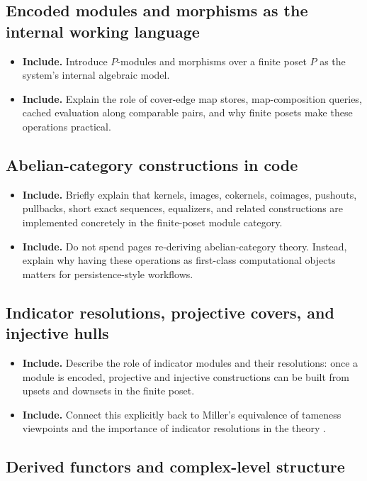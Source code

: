 \documentclass[11pt]{article}
\newenvironment{plan}{\begin{itemize}[leftmargin=1.6em,itemsep=0.35em,topsep=0.25em]}{\end{itemize}}
\newcommand{\includeitems}[1]{\item \textbf{Include.} #1}
\begin{document}
\subsection{Encoded modules and morphisms as the internal working language}

\begin{plan}
    \includeitems{Introduce $P$-modules and morphisms over a finite poset $P$ as the system's internal algebraic model.}
    \includeitems{Explain the role of cover-edge map stores, map-composition queries, cached evaluation along comparable pairs, and why finite posets make these operations practical.}
\end{plan}

\subsection{Abelian-category constructions in code}

\begin{plan}
    \includeitems{Briefly explain that kernels, images, cokernels, coimages, pushouts, pullbacks, short exact sequences, equalizers, and related constructions are implemented concretely in the finite-poset module category.}
    \includeitems{Do not spend pages re-deriving abelian-category theory. Instead, explain why having these operations as first-class computational objects matters for persistence-style workflows.}
\end{plan}

\subsection{Indicator resolutions, projective covers, and injective hulls}

\begin{plan}
    \includeitems{Describe the role of indicator modules and their resolutions: once a module is encoded, projective and injective constructions can be built from upsets and downsets in the finite poset.}
    \includeitems{Connect this explicitly back to Miller's equivalence of tameness viewpoints and the importance of indicator resolutions in the theory \cite{Mil20}.}
\end{plan}

\subsection{Derived functors and complex-level structure}
\end{document}

